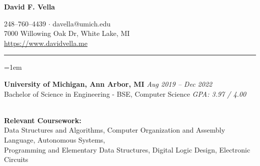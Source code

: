 \documentclass[12pt]{article}
\newcommand{\rheader}[1] { 
    \noindent{ 
        \large 
        \textbf{#1} 
        \par 
    }
    \vspace{-10pt}
    \noindent 
    \rule{7.5in}{0.5pt} 
}
\newcommand{\rdate}[1] {
    \hfill 
    \textit{#1}
}
\newcommand{\ritem} {
    \vspace{-10pt} 
    \item
}
\newcommand{\rurl}[1] {
	\textcolor{blue} {
        \small{
            \uline{
                \url{#1}
            }
        }
    }
}
\newenvironment{rsection} {
    \vspace{-5pt}
    \par 
    \medskip
    \leftskip=1em
    \noindent 
    \ignorespaces
} {
    \par 
    \medskip
    \vspace{5pt}
}
\newenvironment{rlist} {
    \begin{enumerate}[leftmargin=0.5in, label=$\bullet$]
} {
    \end{enumerate}
    \vspace{-10pt}
}
\begin{document}


\begin{center} %
    {\Large \textbf{David F. Vella} \par}
    \vspace{5pt}
    248--760--4439 $\cdot$ davella@umich.edu \\
    7000 Willowing Oak Dr, White Lake, MI \\
    \rurl{https://www.davidvella.me}
\end{center}
\vspace{-10pt}


\rheader{EDUCATION}
\begin{rsection}
    \textbf{University of Michigan, Ann Arbor, MI} \rdate{Aug 2019 -- Dec 2022} \\
    Bachelor of Science in Engineering - BSE, Computer Science \rdate{GPA: 3.97 / 4.00}
    \vspace{5pt} \\
    \noindent \textbf{Relevant Coursework:} \\
    Data Structures and Algorithms, Computer Organization and Assembly Language, Autonomous Systems, \\
    Programming and Elementary Data Structures, Digital Logic Design, Electronic Circuits

\end{rsection}
\end{document}
